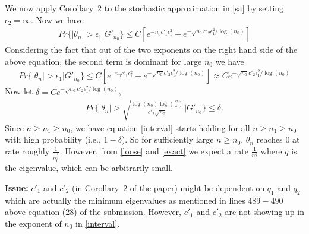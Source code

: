 \documentclass{article}
\begin{document}
We now apply Corollary~$2$ to the stochastic approximation in \eqref{sa} by setting $\epsilon_2=\infty$. Now we have
\begin{align*}
Pr\{ |\theta_n|>\epsilon_1|G'_{n_0}\}\leq C[e^{-n_0c'_1\epsilon_1^2}+e^{-\sqrt{n_0}c'_2\epsilon_1^2/\log(n_0)}]
\end{align*}
Considering the fact that out of the two exponents on the right hand side of the above equation, the second term is dominant for large $n_0$ we have
\begin{align*}
Pr\{ \left|\theta_n\right|>\epsilon_1|G'_{n_0}\}\leq C[e^{-n_0c'_1\epsilon_1^2}+e^{-\sqrt{n_0}c'_2\epsilon_1^2/\log(n_0)}]\approx Ce^{-\sqrt{n_0}c'_2\epsilon_1^2/\log(n_0)}
\end{align*}
Now let $\delta=Ce^{-\sqrt{n_0}c'_2\epsilon_1^2/\log(n_0)}$,
\begin{align}\label{interval}
Pr\Bigg\{ \left|\theta_n\right|> \sqrt{\frac{{\log(n_0) \log(\frac{C}{\delta})}}{{c'_2} \sqrt{n_0}} }\Bigg|G'_{n_0}\Bigg\}\leq \delta.
\end{align}
Since $n\geq n_1\geq n_0$, we have equation \eqref{interval} starts holding for all $n\geq n_1\geq n_0$ with high probability (i.e., $1-\delta$). So for sufficiently large $n\geq n_0$, $\theta_n$ reaches $0$ at rate roughly $\frac1{n_0^{\frac{1}{4}}}$. However, from \eqref{loose} and \eqref{exact} we expect a rate $\frac1{n^q}$ where $q$ is the eigenvalue, which can be arbitrarily small.

\textbf{Issue:} $c'_1$ and $c'_2$ (in Corollary~$2$ of the paper) might be dependent on $q_1$ and $q_2$ which are actually the minimum eigenvalues as mentioned in lines $489-490$ above equation (28) of the submission. However, $c'_1$ and $c'_2$ are not showing up in the exponent of $n_0$ in \eqref{interval}.
\end{document}
